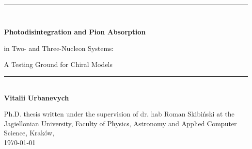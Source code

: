 \documentclass[oneside,a4paper,openright]{report}
\newcommand{\HRule}{\rule{\linewidth}{0.5mm}}
\begin{document}
\newpage

\begin{titlepage}
\begin{center}

~\\[5cm]

\HRule 
\\[0.4cm]
{
\LARGE\bfseries 
Photodisintegration and Pion Absorption

in Two- and Three-Nucleon Systems:

A Testing Ground for Chiral Models
\\[0.4cm] 
}
\HRule \\[0.4cm]

{
\LARGE
\bfseries
Vitalii Urbanevych
}
\vfill

{
\large
Ph.D. thesis written under the supervision of dr. hab Roman Skibi\'nski \newline at the Jagiellonian University,
Faculty of Physics, Astronomy \newline and Applied Computer Science, Krak\'ow,
}
\\
{
\large \today
}


\end{center}
\end{titlepage}
\end{document}
